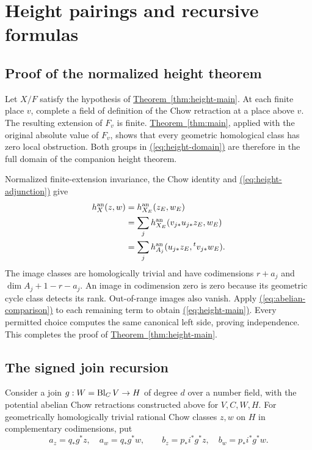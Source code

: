 \documentclass[11pt,a4paper]{article}
\theoremstyle{definition}
\theoremstyle{remark}\newtheorem{remark}[theorem]{Remark}
\numberwithin{equation}{section}
\newcommand{\thmref}[1]{\hyperref[#1]{\textcolor{resultlink}{Theorem~\ref*{#1}}}}
\renewcommand{\eqref}[1]{\hyperref[#1]{\textcolor{equationlink}{(\ref*{#1})}}}
\begin{document}



\section{Height pairings and recursive formulas}\label{sec:heights}

\subsection{Proof of the normalized height theorem}\label{proof:height}

Let $X/F$ satisfy the hypothesis of \thmref{thm:height-main}.
At each finite place $v$, complete a field of definition of
the Chow retraction at a place above $v$. The resulting
extension of $F_v$ is finite. \thmref{thm:main}, applied with
the original absolute value of $F_v$, shows that every geometric
homological class has zero local obstruction. Both groups in
\eqref{eq:height-domain} are therefore in the full domain of
the companion height theorem.

Normalized finite-extension invariance, the Chow identity and
\eqref{eq:height-adjunction} give
\begin{align*}
 h_X^{\mathrm{an}}(z,w)
 &=h_{X_E}^{\mathrm{an}}(z_E,w_E)\\
 &=\sum_jh_{X_E}^{\mathrm{an}}(v_{j*}u_{j*}z_E,w_E)\\
 &=\sum_jh_{A_j}^{\mathrm{an}}(u_{j*}z_E,{}^tv_{j*}w_E).
\end{align*}
The image classes are homologically trivial and have codimensions
$r+a_j$ and $\dim A_j+1-r-a_j$. An image in codimension zero
is zero because its geometric cycle class detects its rank.
Out-of-range images also vanish. Apply
\eqref{eq:abelian-comparison} to each remaining term to obtain
\eqref{eq:height-main}. Every permitted choice computes the
same canonical left side, proving independence. This completes
the proof of \thmref{thm:height-main}.

\subsection{The signed join recursion}

Consider a join $g:W=\operatorname{Bl}_CV\to H$ of degree $d$ over a number
field, with the potential abelian Chow retractions constructed above
for $V,C,W,H$. For geometrically homologically trivial rational
Chow classes $z,w$ on $H$ in complementary codimensions, put
\[
 a_z=q_*g^*z,\quad a_w=q_*g^*w,\qquad
 b_z=p_*i^*g^*z,\quad b_w=p_*i^*g^*w.
\]
\end{document}

